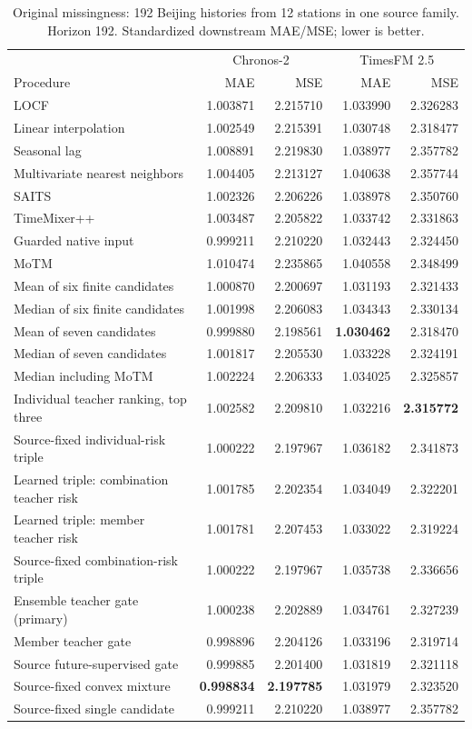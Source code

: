 \begin{table}[!htbp]
\caption{Original missingness: 192 Beijing histories from 12 stations in one source family. Horizon 192. Standardized downstream MAE/MSE; lower is better.}
\label{tab:r6_all_native_h192}
\centering\small
\begin{tabular}{lrrrr}
\toprule
 & \multicolumn{2}{c}{Chronos-2} & \multicolumn{2}{c}{TimesFM 2.5}\\
Procedure & MAE & MSE & MAE & MSE\\
\midrule
LOCF & 1.003871 & 2.215710 & 1.033990 & 2.326283\\
Linear interpolation & 1.002549 & 2.215391 & 1.030748 & 2.318477\\
Seasonal lag & 1.008891 & 2.219830 & 1.038977 & 2.357782\\
Multivariate nearest neighbors & 1.004405 & 2.213127 & 1.040638 & 2.357744\\
SAITS & 1.002326 & 2.206226 & 1.038978 & 2.350760\\
TimeMixer++ & 1.003487 & 2.205822 & 1.033742 & 2.331863\\
Guarded native input & 0.999211 & 2.210220 & 1.032443 & 2.324450\\
MoTM & 1.010474 & 2.235865 & 1.040558 & 2.348499\\
Mean of six finite candidates & 1.000870 & 2.200697 & 1.031193 & 2.321433\\
Median of six finite candidates & 1.001998 & 2.206083 & 1.034343 & 2.330134\\
Mean of seven candidates & 0.999880 & 2.198561 & \textbf{1.030462} & 2.318470\\
Median of seven candidates & 1.001817 & 2.205530 & 1.033228 & 2.324191\\
Median including MoTM & 1.002224 & 2.206333 & 1.034025 & 2.325857\\
Individual teacher ranking, top three & 1.002582 & 2.209810 & 1.032216 & \textbf{2.315772}\\
Source-fixed individual-risk triple & 1.000222 & 2.197967 & 1.036182 & 2.341873\\
Learned triple: combination teacher risk & 1.001785 & 2.202354 & 1.034049 & 2.322201\\
Learned triple: member teacher risk & 1.001781 & 2.207453 & 1.033022 & 2.319224\\
Source-fixed combination-risk triple & 1.000222 & 2.197967 & 1.035738 & 2.336656\\
Ensemble teacher gate (primary) & 1.000238 & 2.202889 & 1.034761 & 2.327239\\
Member teacher gate & 0.998896 & 2.204126 & 1.033196 & 2.319714\\
Source future-supervised gate & 0.999885 & 2.201400 & 1.031819 & 2.321118\\
Source-fixed convex mixture & \textbf{0.998834} & \textbf{2.197785} & 1.031979 & 2.323520\\
Source-fixed single candidate & 0.999211 & 2.210220 & 1.038977 & 2.357782\\
\bottomrule
\end{tabular}
\end{table}


